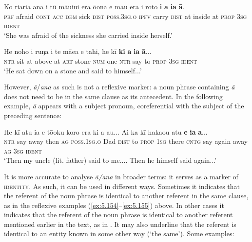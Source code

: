 \ea\label{ex:5.154}
\gll Ko ri{\ꞌ}ari{\ꞌ}a {\ꞌ}ana {\ꞌ}i tū māuiui era ō{\ꞌ}ona e ma{\ꞌ}u era {\ꞌ}i roto  \textbf{i} \textbf{a} \textbf{ia} \textbf{{\ꞌ}ā}.\\
\textsc{prf} afraid \textsc{cont} \textsc{acc} \textsc{dem} sick \textsc{dist} \textsc{poss.3sg.o} \textsc{ipfv} carry \textsc{dist} at inside  at \textsc{prop} \textsc{3sg} \textsc{ident}\\

\glt 
‘She was afraid of the sickness she carried inside herself.’ \textstyleExampleref{[R301.091]} 
\z

\ea\label{ex:5.155}
\gll He noho {\ꞌ}i ruŋa i te mā{\ꞌ}ea e tahi, he kī \textbf{ki} \textbf{a} \textbf{ia} \textbf{{\ꞌ}ā}... \\
\textsc{ntr} sit at above at \textsc{art} stone \textsc{num} one \textsc{ntr} say to \textsc{prop} \textsc{3sg} \textsc{ident} \\

\glt
‘He sat down on a stone and said to himself...’ \textstyleExampleref{[R229.365]} 
\z

However, \textit{{\ꞌ}ā}/\textit{{\ꞌ}ana} as such is not a reflexive marker: a noun phrase containing \textit{{\ꞌ}ā} does not need to be in the same clause as its antecedent. In the following example, \textit{{\ꞌ}ā} appears with a subject pronoun, coreferential with the subject of the preceding sentence: 

\ea\label{ex:5.156}
\gll He kī atu ia e tō{\ꞌ}oku koro era ki a au... {\ꞌ}Ai ka kī  haka{\ꞌ}ou atu \textbf{e} \textbf{ia} \textbf{{\ꞌ}ā}...\\
\textsc{ntr} say away then \textsc{ag} \textsc{poss.1sg.o} Dad \textsc{dist} to \textsc{prop} \textsc{1sg} there \textsc{cntg} say  again away \textsc{ag} \textsc{3sg} \textsc{ident}\\

\glt
‘Then my uncle (lit. father) said to me.... Then he himself said again...’ \textstyleExampleref{[R230.254-6]}
\z

It is more accurate to analyse \textit{{\ꞌ}ā/{\ꞌ}ana} in broader terms: it serves as a marker of \textsc{identity}. As such, it can be used in different ways. Sometimes it indicates that the referent of the noun phrase is identical to another referent in the same clause, as in the reflexive examples (\ref{ex:5.154}–\ref{ex:5.155}) above. In other cases it indicates that the referent of the noun phrase is identical to another referent mentioned earlier in the text, as in . It may also underline that the referent is identical to an entity known in some other way (‘the same’). Some examples:

